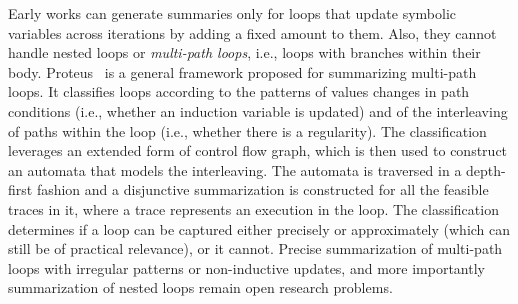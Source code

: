 Early works can generate summaries only for loops that update symbolic variables across iterations by adding a fixed amount to them. Also, they cannot handle nested loops or {\em multi-path loops}, i.e., loops with branches within their body. Proteus~\cite{XX-FSE16} is a general framework proposed for summarizing multi-path loops. It classifies loops according to the patterns of values changes in path conditions (i.e., whether an induction variable is updated) and of the interleaving of paths within the loop (i.e., whether there is a regularity). The classification leverages an extended form of control flow graph, which is then used to construct an automata that models the interleaving. The automata is traversed in a depth-first fashion and a disjunctive summarization is constructed for all the feasible traces in it, where a trace represents an execution in the loop. The classification determines if a loop can be captured either precisely or approximately (which can still be of practical relevance), or it cannot. Precise summarization of multi-path loops with irregular patterns or non-inductive updates, and more importantly summarization of nested loops remain open research problems.

%

